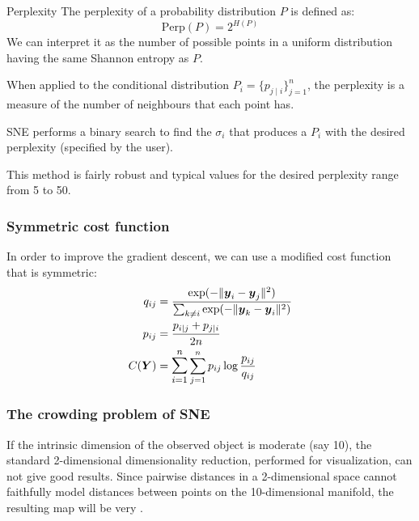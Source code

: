 \begin{definition}{Perplexity}{}
	The perplexity of a probability distribution $P$ is defined as:
	\begin{equation*}
		\text{Perp}(P) = 2^{H(P)}
	\end{equation*}
	\tcblower
	We can interpret it as the number of possible points in a uniform
	distribution having the same Shannon entropy as $P$.
	\tcbline
	\begin{note}
		When applied to the conditional distribution $P_i = \{p_{j\mid i}\}^n_{j=1}$,
		the perplexity is a measure of the number of neighbours that each point has.
	\end{note}

\end{definition}

\begin{marker}
	SNE performs a binary search to find the $\sigma_i$ that produces a
	$P_i$ with the desired perplexity (specified by the user).
\end{marker}

This method is fairly robust and typical values for the desired perplexity
range from 5 to 50.

\subsubsection{Symmetric cost function}
In order to improve the gradient descent, we can use a modified cost function
that is symmetric:
\begin{align*}
    q_{ij} &= \frac{\exp(-\lVert \boldsymbol y_i - \boldsymbol y_j \rVert^2)}{\sum_{k \neq i} \exp(-\lVert \boldsymbol y_k - \boldsymbol y_i \rVert^2)} \\
    p_{ij} &= \frac{p_{i \mid j} + p_{j \mid i}}{2n} \\
    C(\boldsymbol Y) &=
	\mathlarger{\sum_{i=1}^n} \sum_{j=1}^n p_{ij} \log \frac{p_{ij}}{q_{ij}}
\end{align*}

\subsubsection{The crowding problem of SNE}
If the intrinsic dimension of the observed object is moderate (say 10),
the standard 2-dimensional dimensionality reduction, performed for
visualization, can not give good results. Since pairwise distances
in a 2-dimensional space cannot faithfully model distances between points
on the 10-dimensional manifold, the resulting map will be very .

